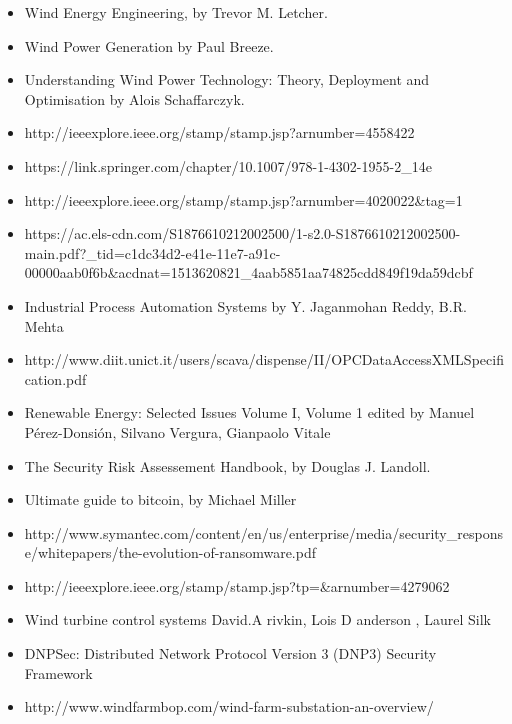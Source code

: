 \documentclass[twosided,a4,10pt]{article}
\begin{document}


\begin{itemize}
\item Wind Energy Engineering, by Trevor M. Letcher.
\item Wind Power Generation by Paul Breeze. 
\item Understanding Wind Power Technology: Theory, Deployment and Optimisation by Alois Schaffarczyk. 
\item http://ieeexplore.ieee.org/stamp/stamp.jsp?arnumber=4558422 
\item https://link.springer.com/chapter/10.1007/978-1-4302-1955-2\_14e
\item http://ieeexplore.ieee.org/stamp/stamp.jsp?arnumber=4020022\&tag=1 
\item https://ac.els-cdn.com/S1876610212002500/1-s2.0-S1876610212002500-main.pdf?\_tid=c1dc34d2-e41e-11e7-a91c-00000aab0f6b\&acdnat=1513620821\_4aab5851aa74825cdd849f19da59dcbf 
\item Industrial Process Automation Systems by Y. Jaganmohan Reddy, B.R. Mehta
\item http://www.diit.unict.it/users/scava/dispense/II/OPCDataAccessXMLSpecification.pdf
\item Renewable Energy: Selected Issues Volume I, Volume 1
edited by Manuel Pérez-Donsión, Silvano Vergura, Gianpaolo Vitale
\item The Security Risk Assessement Handbook, by Douglas J. Landoll.
\item Ultimate guide to bitcoin, by Michael Miller
\item http://www.symantec.com/content/en/us/enterprise/media/security\_response/whitepapers/the-evolution-of-ransomware.pdf
\item http://ieeexplore.ieee.org/stamp/stamp.jsp?tp=\&arnumber=4279062
\item Wind turbine control systems David.A rivkin, Lois D anderson , Laurel Silk
\item DNPSec: Distributed Network Protocol Version 3 (DNP3) Security Framework
\item http://www.windfarmbop.com/wind-farm-substation-an-overview/

\end{itemize}
\end{document}
